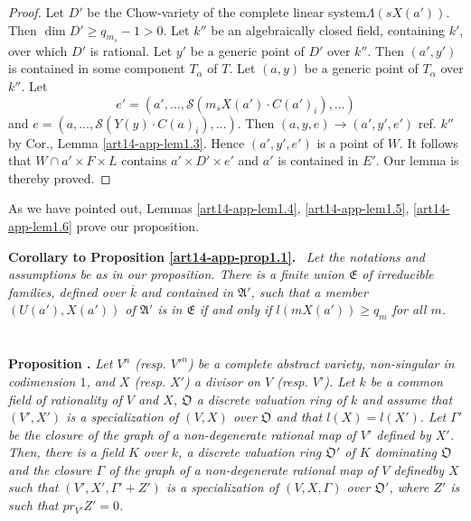 \begin{proof}
Let $D'$ be the Chow-variety of the complete linear system\break $\Lambda(sX(a'))$. Then $\dim D'\geq q_{m_{s}}-1>0$. Let $k''$ be an algebraically closed field, containing $k'$, over which $D'$ is rational. Let $y'$ be a generic point of $D'$ over $k''$. Then $(a',y')$ is contained in some component $T_{\alpha}$ of $T$. Let $(a,y)$ be a generic point of $T_{\alpha}$ over $k''$. Let 
$$
e'=(a',\ldots,\mathscr{S}(m_{s}X(a')\cdot C(a')_{i}),\ldots)
$$ 
and $e=(a,\ldots,\mathscr{S}(Y(y)\cdot C(a)_{i}),\ldots )$. Then $(a,y,e)\to (a',y',e')$ ref. $k''$ by Cor., Lemma \ref{art14-app-lem1.3}. Hence $(a',y',e')$ is a point of $W$. It follows that $W\cap a'\times F\times L$ contains $a'\times D'\times e'$ and $a'$ is contained in $E'$. Our lemma is thereby proved.
\end{proof}

As we have pointed out, Lemmas \ref{art14-app-lem1.4}, \ref{art14-app-lem1.5}, \ref{art14-app-lem1.6} prove our proposition.

\medskip
\noindent
{\bf Corollary to Proposition \ref{art14-app-prop1.1}.}~ {\em Let the notations and assumptions be as in our proposition. There is a finite union $\mathfrak{E}$ of irreducible families, defined over $\overline{k}$ and contained in $\mathfrak{A}'$, such that a member $(U(a'),X(a'))$ of $\mathfrak{A}'$ is in $\mathfrak{E}$ if and only if $l(mX(a'))\geq q_{m}$ for all $m$.}

\section{}\label{art14-app-sec2}

\noindent
{\bf Proposition .\label{art14-app-prop2.1}}
{\em Let $V^{n}$ (resp. ${V'}^{n}$) be a complete abstract variety, non-singular in codimension $1$, and $X$ (resp. $X'$) a divisor on $V$ (resp. $V'$). Let $k$ be a common field of rationality of $V$ and $X$, $\mathfrak{O}$ a discrete valuation ring of $k$ and assume that $(V',X')$ is a specialization of $(V,X)$ over $\mathfrak{O}$ and that $l(X)=l(X')$. Let $\Gamma'$ be the closure of the graph of a non-degenerate rational map of $V'$ defined by $X'$. Then, there is a field $K$ over $k$, a discrete valuation ring $\mathfrak{O}'$ of $K$ dominating $\mathfrak{O}$ and the closure $\Gamma$ of the graph of a non-degenerate rational map of $V$ defined\pageoriginale by $X$ such that $(V',X',\Gamma'+Z')$ is a specialization of $(V,X,\Gamma)$ over $\mathfrak{O}'$, where $Z'$ is such that $pr_{V'}Z'=0$.}


